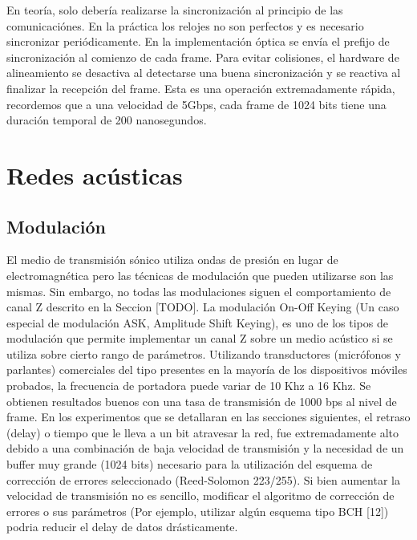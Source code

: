 En teoría, solo debería realizarse la sincronización al principio de las comunicaciónes. En la práctica los relojes no son perfectos y es necesario sincronizar periódicamente. En la implementación óptica se envía el prefijo de sincronización al comienzo de cada frame.
Para evitar colisiones, el hardware de alineamiento se desactiva al detectarse una buena sincronización y se reactiva al finalizar la recepción del frame. Esta es una operación extremadamente rápida, recordemos que a una velocidad de 5Gbps, cada frame de 1024 bits tiene una duración temporal de 200 nanosegundos.

\section{Redes acústicas}

\subsection{Modulación}
El medio de transmisión sónico utiliza ondas de presión en lugar de electromagnética pero las técnicas de modulación que pueden utilizarse son las mismas.
Sin embargo, no todas las modulaciones siguen el comportamiento de canal Z descrito en la Seccion [TODO].
La modulación On-Off Keying (Un caso especial de modulación ASK, Amplitude Shift Keying), es uno de los tipos de modulación que permite implementar un canal Z sobre un medio acústico si se utiliza sobre cierto rango de parámetros. Utilizando transductores (micrófonos y parlantes) comerciales del tipo presentes en la mayoría de los dispositivos móviles probados, la frecuencia de portadora puede variar de 10 Khz a 16 Khz. Se obtienen resultados buenos con una tasa de transmisión de 1000 bps al nivel de frame. En los experimentos que se detallaran en las secciones siguientes, el retraso (delay) o tiempo que le lleva a un bit atravesar la red, fue extremadamente alto debido a una combinación de baja velocidad de transmisión y la necesidad de un buffer muy grande (1024 bits) necesario para la utilización del esquema de corrección de errores seleccionado (Reed-Solomon 223/255). Si bien aumentar la velocidad de transmisión no es sencillo, modificar el algoritmo de corrección de errores o sus parámetros (Por ejemplo, utilizar algún esquema tipo BCH [12]) podria reducir el delay de datos drásticamente.

